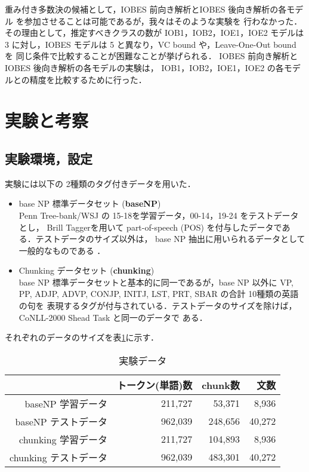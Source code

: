 重み付き多数決の候補として，IOBES 前向き解析とIOBES 後向き解析の各モデル
を参加させることは可能であるが，我々はそのような実験を
行わなかった．その理由として，推定すべきクラスの数が IOB1，IOB2，IOE1，IOE2
モデルは 3 に対し，IOBES モデルは 5 と異なり，VC bound や，Leave-One-Out
bound を 同じ条件で比較することが困難なことが挙げられる．
IOBES 前向き解析とIOBES 後向き解析の各モデルの実験は，
IOB1，IOB2，IOE1，IOE2 の各モデルとの精度を比較するために行った．

\section{実験と考察}
\subsection{実験環境，設定}
実験には以下の 2種類のタグ付きデータを用いた．
\begin{itemize}
 \item base NP 標準データセット ({\bf baseNP})\\
       Penn Tree-bank/WSJ の 15-18を学習データ，00-14，19-24 をテストデータとし，
       Brill Tagger\cite{Brill95}を用いて part-of-speech 
       (POS) を付与したデータである．テストデータのサイズ以外は，
       base NP 抽出に用いられるデータとして一般的なものである
 ．
 \item Chunking データセット ({\bf chunking})\\
        base NP 標準データセットと基本的に同一であるが，base NP 以外に 
       {\small VP, PP, ADJP, ADVP, CONJP, INITJ, LST, PRT, SBAR} の合計 10種類の英語の句を
       表現するタグが付与されている．テストデータのサイズを除けば，
       CoNLL-2000 Shead Task\cite{Tjong_Kim_Sang2000c} と同一のデータで
       ある．
\end{itemize}

それぞれのデータのサイズを表\ref{fg:env}に示す．

\begin{table}
\begin{center}
\begin{tabular}{r|r|r|r}
\hline
\hline
         & トークン(単語)数 & chunk数 & 文数 \\
\hline
baseNP 学習データ     & 211,727 &  53,371    &  8,936 \\
baseNP テストデータ   & 962,039 &   248,656  &  40,272 \\
chunking 学習データ   & 211,727  &  104,893   &  8,936 \\
chunking テストデータ & 962,039 &  483,301  &  40,272 \\
\end{tabular}
\end{center}
\caption{実験データ}
\label{fg:env}
\end{table}

